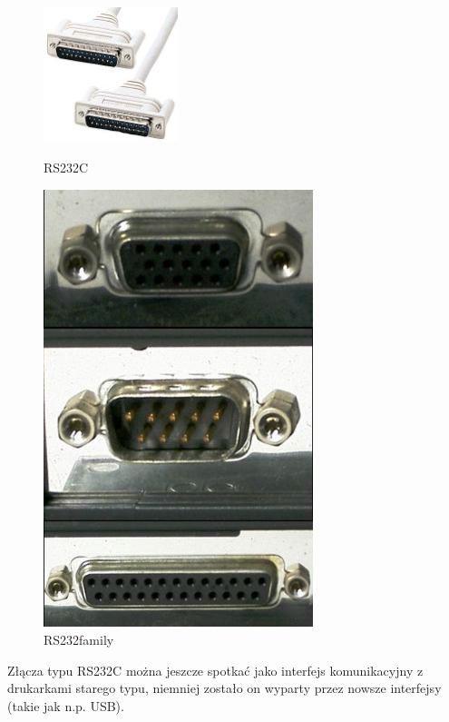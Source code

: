 \documentclass{BscUS}
\begin{document}
\begin{figure}[H]
\centering
\parbox{5cm}{
\includegraphics[width=0.35\textwidth]{./img/rs232C}
\caption{RS232C}
\label{fig:RS232C}}
\qquad
\begin{minipage}{5cm}
\centering
\includegraphics[width=0.7\textwidth]{./img/rs232family}
\caption{RS232family}
\label{fig:RS232Family}
\end{minipage}
\end{figure}
\noindent Złącza typu RS232C można jeszcze spotkać jako interfejs komunikacyjny z drukarkami starego typu, niemniej zostało on wyparty przez nowsze interfejsy (takie jak n.p. USB). \\
\end{document}
